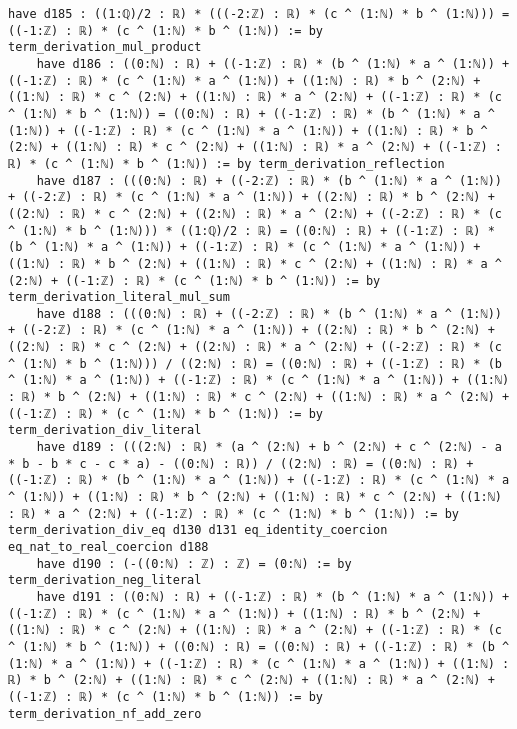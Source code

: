 \documentclass{article}
\begin{document}
\begin{tcolorbox}[colback=white!10, width=\linewidth]
\begin{lstlisting}[language=Lean4]
    have d185 : ((1:ℚ)/2 : ℝ) * (((-2:ℤ) : ℝ) * (c ^ (1:ℕ) * b ^ (1:ℕ))) = ((-1:ℤ) : ℝ) * (c ^ (1:ℕ) * b ^ (1:ℕ)) := by term_derivation_mul_product
    have d186 : ((0:ℕ) : ℝ) + ((-1:ℤ) : ℝ) * (b ^ (1:ℕ) * a ^ (1:ℕ)) + ((-1:ℤ) : ℝ) * (c ^ (1:ℕ) * a ^ (1:ℕ)) + ((1:ℕ) : ℝ) * b ^ (2:ℕ) + ((1:ℕ) : ℝ) * c ^ (2:ℕ) + ((1:ℕ) : ℝ) * a ^ (2:ℕ) + ((-1:ℤ) : ℝ) * (c ^ (1:ℕ) * b ^ (1:ℕ)) = ((0:ℕ) : ℝ) + ((-1:ℤ) : ℝ) * (b ^ (1:ℕ) * a ^ (1:ℕ)) + ((-1:ℤ) : ℝ) * (c ^ (1:ℕ) * a ^ (1:ℕ)) + ((1:ℕ) : ℝ) * b ^ (2:ℕ) + ((1:ℕ) : ℝ) * c ^ (2:ℕ) + ((1:ℕ) : ℝ) * a ^ (2:ℕ) + ((-1:ℤ) : ℝ) * (c ^ (1:ℕ) * b ^ (1:ℕ)) := by term_derivation_reflection
    have d187 : (((0:ℕ) : ℝ) + ((-2:ℤ) : ℝ) * (b ^ (1:ℕ) * a ^ (1:ℕ)) + ((-2:ℤ) : ℝ) * (c ^ (1:ℕ) * a ^ (1:ℕ)) + ((2:ℕ) : ℝ) * b ^ (2:ℕ) + ((2:ℕ) : ℝ) * c ^ (2:ℕ) + ((2:ℕ) : ℝ) * a ^ (2:ℕ) + ((-2:ℤ) : ℝ) * (c ^ (1:ℕ) * b ^ (1:ℕ))) * ((1:ℚ)/2 : ℝ) = ((0:ℕ) : ℝ) + ((-1:ℤ) : ℝ) * (b ^ (1:ℕ) * a ^ (1:ℕ)) + ((-1:ℤ) : ℝ) * (c ^ (1:ℕ) * a ^ (1:ℕ)) + ((1:ℕ) : ℝ) * b ^ (2:ℕ) + ((1:ℕ) : ℝ) * c ^ (2:ℕ) + ((1:ℕ) : ℝ) * a ^ (2:ℕ) + ((-1:ℤ) : ℝ) * (c ^ (1:ℕ) * b ^ (1:ℕ)) := by term_derivation_literal_mul_sum
    have d188 : (((0:ℕ) : ℝ) + ((-2:ℤ) : ℝ) * (b ^ (1:ℕ) * a ^ (1:ℕ)) + ((-2:ℤ) : ℝ) * (c ^ (1:ℕ) * a ^ (1:ℕ)) + ((2:ℕ) : ℝ) * b ^ (2:ℕ) + ((2:ℕ) : ℝ) * c ^ (2:ℕ) + ((2:ℕ) : ℝ) * a ^ (2:ℕ) + ((-2:ℤ) : ℝ) * (c ^ (1:ℕ) * b ^ (1:ℕ))) / ((2:ℕ) : ℝ) = ((0:ℕ) : ℝ) + ((-1:ℤ) : ℝ) * (b ^ (1:ℕ) * a ^ (1:ℕ)) + ((-1:ℤ) : ℝ) * (c ^ (1:ℕ) * a ^ (1:ℕ)) + ((1:ℕ) : ℝ) * b ^ (2:ℕ) + ((1:ℕ) : ℝ) * c ^ (2:ℕ) + ((1:ℕ) : ℝ) * a ^ (2:ℕ) + ((-1:ℤ) : ℝ) * (c ^ (1:ℕ) * b ^ (1:ℕ)) := by term_derivation_div_literal
    have d189 : (((2:ℕ) : ℝ) * (a ^ (2:ℕ) + b ^ (2:ℕ) + c ^ (2:ℕ) - a * b - b * c - c * a) - ((0:ℕ) : ℝ)) / ((2:ℕ) : ℝ) = ((0:ℕ) : ℝ) + ((-1:ℤ) : ℝ) * (b ^ (1:ℕ) * a ^ (1:ℕ)) + ((-1:ℤ) : ℝ) * (c ^ (1:ℕ) * a ^ (1:ℕ)) + ((1:ℕ) : ℝ) * b ^ (2:ℕ) + ((1:ℕ) : ℝ) * c ^ (2:ℕ) + ((1:ℕ) : ℝ) * a ^ (2:ℕ) + ((-1:ℤ) : ℝ) * (c ^ (1:ℕ) * b ^ (1:ℕ)) := by term_derivation_div_eq d130 d131 eq_identity_coercion eq_nat_to_real_coercion d188
    have d190 : (-((0:ℕ) : ℤ) : ℤ) = (0:ℕ) := by term_derivation_neg_literal
    have d191 : ((0:ℕ) : ℝ) + ((-1:ℤ) : ℝ) * (b ^ (1:ℕ) * a ^ (1:ℕ)) + ((-1:ℤ) : ℝ) * (c ^ (1:ℕ) * a ^ (1:ℕ)) + ((1:ℕ) : ℝ) * b ^ (2:ℕ) + ((1:ℕ) : ℝ) * c ^ (2:ℕ) + ((1:ℕ) : ℝ) * a ^ (2:ℕ) + ((-1:ℤ) : ℝ) * (c ^ (1:ℕ) * b ^ (1:ℕ)) + ((0:ℕ) : ℝ) = ((0:ℕ) : ℝ) + ((-1:ℤ) : ℝ) * (b ^ (1:ℕ) * a ^ (1:ℕ)) + ((-1:ℤ) : ℝ) * (c ^ (1:ℕ) * a ^ (1:ℕ)) + ((1:ℕ) : ℝ) * b ^ (2:ℕ) + ((1:ℕ) : ℝ) * c ^ (2:ℕ) + ((1:ℕ) : ℝ) * a ^ (2:ℕ) + ((-1:ℤ) : ℝ) * (c ^ (1:ℕ) * b ^ (1:ℕ)) := by term_derivation_nf_add_zero

\end{lstlisting}
\end{tcolorbox}
\end{document}

